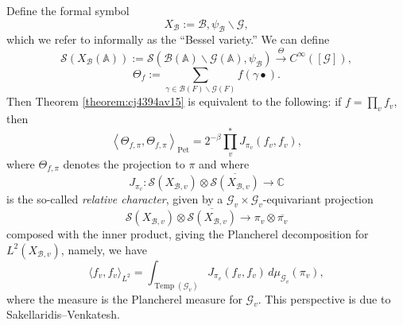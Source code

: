 \documentclass[reqno]{amsart} 
\begin{document}
\begin{remark}\label{remark:cj4460ni43}
  Define the formal symbol
  \begin{equation*}
X_{\mathcal{B} } := \mathcal{B}, \psi_{\mathcal{B} } \backslash \mathcal{G},
  \end{equation*}
  which we refer to informally as the ``Bessel variety.''  We can define
  \begin{equation*}
    \mathcal{S} (X_{\mathcal{B} } (\mathbb{A} )) := \mathcal{S} \left( \mathcal{B} (\mathbb{A} ) \backslash \mathcal{G} (\mathbb{A} ), \psi_{\mathcal{B}} \right)
    \xrightarrow{\Theta} C^\infty ([\mathcal{G} ]),
  \end{equation*}
  \begin{equation*}
\Theta_f := \sum_{\gamma \in \mathcal{B} (F) \backslash \mathcal{G} (F) } f (\gamma \bullet ).
  \end{equation*}
  Then Theorem \ref{theorem:cj4394av15} is equivalent to the following: if $f = \prod_v f_v $, then
  \begin{equation*}
    \left\langle \Theta_{f, \pi }, \Theta_{f, \pi } \right\rangle_{\mathrm{Pet}}
    = 2^{- \beta } \prod_v^\ast J_{\pi_v } (f_v, f_v ),
  \end{equation*}
  where $\Theta_{f, \pi }$ denotes the projection to $\pi$ and where
  \begin{equation*}
J_{\pi_v } : \mathcal{S} (X_{\mathcal{B}, v}) \otimes \overline{\mathcal{S} (X_{\mathcal{B}, v})} \rightarrow \mathbb{C} 
  \end{equation*}
  is the so-called \emph{relative character}, given by a $\mathcal{G}_v \times \mathcal{G}_v$-equivariant projection
  \begin{equation*}
    \mathcal{S} (X_{\mathcal{B}, v}) \otimes \overline{\mathcal{S} (X_{\mathcal{B}, v})}
    \rightarrow \pi_v \otimes \overline{\pi_v }
  \end{equation*}
  composed with the inner product, giving the Plancherel decomposition for $L^2 (X_{\mathcal{B}, v})$, namely, we have
  \begin{equation*}
    \langle f_v, f_v  \rangle_{L^2 } = \int_{\operatorname{Temp} (\mathcal{G}_v )}
    J_{\pi_v } (f_v, f_v ) \, d \mu_{\mathcal{G}_v } (\pi_v ),
  \end{equation*}
  where the measure is the Plancherel measure for $\mathcal{G}_v$.  This perspective is due to Sakellaridis--Venkatesh.
\end{remark}
\end{document}
